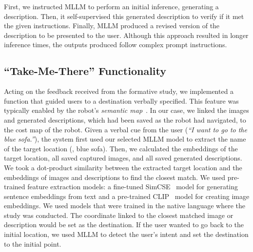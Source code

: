 First, we instructed MLLM to perform an initial inference, generating a description. 
Then, it self-supervised this generated description to verify if it met the given instructions. 
Finally, MLLM produced a revised version of the description to be presented to the user.
Although this approach resulted in longer inference times, the outputs produced follow complex prompt instructions.


\subsection{``Take-Me-There'' Functionality}
\label{sec:take_me_there}
Acting on the feedback received from the formative study, we implemented a function that guided users to a destination verbally specified.
This feature was typically enabled by the robot's \textit{semantic map}~\cite{shafiullah2022clip,yokoyama2024vlfm,liu2024dragon}. 
In our case, we linked the images and generated descriptions, which had been saved as the robot had navigated, to the cost map of the robot.
Given a verbal cue from the user (\eg \textit{``I want to go to the blue sofa.''}), the system first used our selected MLLM model to extract the name of the target location (\eg, blue sofa).
Then, we calculated the embeddings of the target location, all saved captured images, and all saved generated descriptions. 
We took a dot-product similarity between the extracted target location and the embeddings of images and descriptions to find the closest match.
We used pre-trained feature extraction models: a fine-tuned SimCSE~\cite{gao2021simcse} model for generating sentence embeddings from text and a pre-trained CLIP~\cite{radford2021learning} model for creating image embeddings.
We used models that were trained in the native language where the study was conducted.
The coordinate linked to the closest matched image or description would be set as the destination.
If the user wanted to go back to the initial location, we used MLLM to detect the user's intent and set the destination to the initial point.

